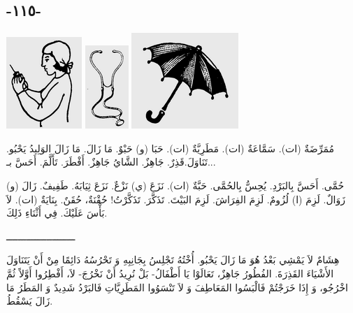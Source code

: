 \documentclass[a5paper]{article}
\begin{document}
\subsection{-١١٥-}
 \includegraphics[width=1.1252in,height=1.3646in]{MuhammadBagauddinlatinized-img320.png}   \includegraphics[width=0.6457in,height=1.2398in]{MuhammadBagauddinlatinized-img321.png}   \includegraphics[width=1.5937in,height=1.4272in]{MuhammadBagauddinlatinized-img322.png} 

مُمَرِّضَةٌ (ات). سَمَّاعَةٌ (ات). مَطَرِيَّةٌ (ات). حَبَا (و) حَبْوٌ. مَا زَالَ. مَا زَالَ الوَلِيدُ يَحْبُو. تَنَاوَلَ.قَذِرٌ. جَاهِزٌ. الشَّايُ جَاهِزٌ. أَفْطَرَ. تَأَلَّمَ. أَحَسَّ بـ...

حُمَّى. أَحَسَّ بِالبَرْدِ. يُحِسُّ بِالحُمَّى. حَبَّةٌ (ات). نَزَعَ (ي) نَزْعٌ. نَزَعَ ثِيَابَهُ. طَفِيفٌ. زَالَ (و) زَوَالٌ. لَزِمَ (ا) لُزُومٌ. لَزِمَ الفِرَاشَ. لَزِمَ البَيْتَ. تَذَكَّرَ. تَذَكَّرْتُ! حُقْنَةٌ، حُقَنٌ. بِنَايَةٌ (ات). لاَ بَأْسَ عَلَيْكَ. فِي أَثْنَاءِ ذَلِكَ.

ــــــــــــــــــــــــ

هِشَامٌ لاَ يَمْشِي بَعْدُ هُوَ مَا زَالَ يَحْبُو. أُخْتُهُ تَجْلِسُ بِجَانِبِهِ وَ تَحْرُسُهُ دَائِمًا مِنْ أَنْ يَتَنَاوَلَ الأَشْيَاءَ القَذِرَةَ. الفُطُورُ جَاهِزٌ، تَعَالَوْا يَا أَطْفَالُ- بَلْ نُرِيدُ أَنْ نَخْرُجَ- لاَ، أَفْطِرُوا أَوَّلاً ثُمَّ اخْرُجُو، وَ إِذَا خَرَجْتُمْ فَالْبَسُوا المَعَاطِفَ وَ لاَ تَنْسَوُوا المَطَرِيَّاتِ فَالبَرْدُ شَدِيدٌ وَ المَطَرُ مَا زَالَ يَسْقُطُ.
\end{document}
